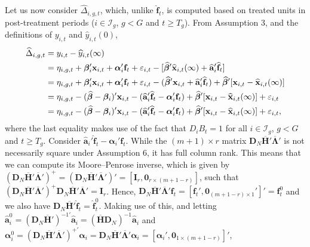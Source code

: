 \documentclass[12pt,fleqn]{article}
\def\*#1{\mathbf{#1}}
\def\+#1{\boldsymbol{#1}}
\begin{document}
Let us now consider $\widehat \Delta_{i,g,t}$, which, unlike $\widehat{\*f}_t$, is computed based on treated units in post-treatment periods ($i\in \mathcal{I}_g$, $g < G$ and $t \geq T_g$). From Assumption 3, and the definitions of $y_{i,t}$ and $\widehat y_{i,t}(0)$, 
\begin{align}
\widehat \Delta_{i,g,t} & = y_{i,t} - \widehat y_{i,t}(\infty) \notag\\
& = \eta_{i,g,t} + \+\beta_i'\*x_{i,t} + \+\alpha_i'\*f_t + \varepsilon_{i,t} - [\widehat{\+\beta}'\widehat{\*x}_{i,t}(\infty) + \widehat{\*a}_i'\widehat{\*f}_t]  \notag\\
& = \eta_{i,g,t} + \+\beta_i'\*x_{i,t} + \+\alpha_i'\*f_t + \varepsilon_{i,t} - (\widehat{\+\beta}'\*x_{i,t} + \widehat{\*a}_i'\widehat{\*f}_t) + \widehat{\+\beta}'[\*x_{i,t} - \widehat{\*x}_{i,t}(\infty)]  \notag\\
& = \eta_{i,g,t} - (\widehat{\+\beta} - \+\beta_i)'\*x_{i,t}- (\widehat{\*a}_i'\widehat{\*f}_t - \+\alpha_i'\*f_t)  + \widehat{\+\beta}'[\*x_{i,t} - \widehat{\*x}_{i,t}(\infty)] + \varepsilon_{i,t} \notag\\
& = \eta_{i,g,t} - (\widehat{\+\beta} - \+\beta_i)'\*x_{i,t} - (\widehat{\*a}_i'\widehat{\*f}_t - \+\alpha_i'\*f_t)  + \widehat{\+\beta}'[\*x_{i,t} - \widehat{\*x}_{i,t}(\infty)] + \varepsilon_{i,t} ,
\end{align}
where the last equality makes use of the fact that $D_iB_t = 1$ for all $i\in \mathcal{I}_g$, $g < G$ and $t \geq T_g$. Consider $\widehat{\*a}_i'\widehat{\*f}_t - \+\alpha_i'\*f_t$. While the $(m+1)\times r$ matrix $\mathbf{D}_N\overline{\mathbf{H}}'\overline{\boldsymbol{\Lambda}}'$ is not necessarily square under Assumption 6, it has full column rank. This means that we can compute its Moore--Penrose inverse, which is given by $(\mathbf{D}_N\overline{\mathbf{H}}'\overline{\boldsymbol{\Lambda}}')^+ = (\mathbf{D}_N\overline{\mathbf{H}}'\overline{\boldsymbol{\Lambda}}')' = [ \mathbf{I}_r, \mathbf{0}_{r\times (m+1-r)} ]$, such that $(\mathbf{D}_N\overline{\mathbf{H}}'\overline{\boldsymbol{\Lambda}}')^+ \mathbf{D}_N\overline{\mathbf{H}}'\overline{\boldsymbol{\Lambda}}' = \mathbf{I}_r$. Hence, $\mathbf{D}_N\overline{\mathbf{H}}'\overline{\boldsymbol{\Lambda}}'\*f_t = [\*f_t', \mathbf{0}_{(m+1-r)\times 1}']' = \*f_t^0$ and we also have $\*{D}_N\overline{\*{H}}'\widehat{\*{f}}_t=\widehat{\*{f}}^0_t$. Making use of this, and letting $\widehat{\*a}_i^0 = (\*{D}_N\overline{\*{H}}')^{-1\prime}\widehat{\*a}_i= (\overline{\*{H}}\*{D}_N)^{-1}\widehat{\*a}_i$ and $\+\alpha_i^0 = (\mathbf{D}_N\overline{\mathbf{H}}'\overline{\boldsymbol{\Lambda}}')^{+\prime} \+\alpha_i= \mathbf{D}_N\overline{\mathbf{H}}'\overline{\boldsymbol{\Lambda}}'\+\alpha_i = [ \+\alpha_i ', \mathbf{0}_{1\times (m+1-r)} ]'$,
\end{document}
